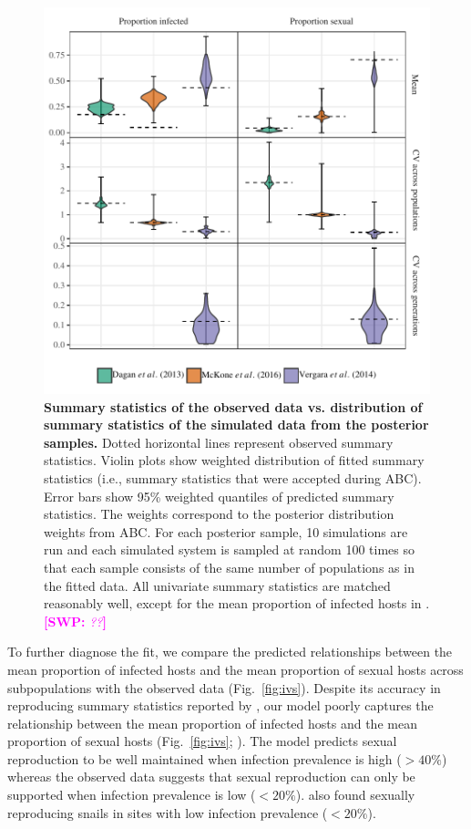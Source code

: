 \documentclass{article}\usepackage[]{graphicx}\usepackage[]{color}
\newcommand{\comment}[3]{\textcolor{#1}{\textbf{[#2: }\textit{#3}\textbf{]}}}
\newcommand{\swp}[1]{\comment{magenta}{SWP}{#1}}
\newcommand{\fref}[1]{Fig.~\ref{fig:#1}}
\begin{document}
\begin{figure}[!ht]
\includegraphics[width=\textwidth]{../fig/smc_summary.pdf}
\caption{{\bf Summary statistics of the observed data vs. distribution of summary statistics of the simulated data from the posterior samples.}
Dotted horizontal lines represent observed summary statistics.
Violin plots show weighted distribution of fitted summary statistics (i.e., summary statistics that were accepted during ABC). 
Error bars show 95\% weighted quantiles of predicted summary statistics.
The weights correspond to the posterior distribution weights from ABC.
For each posterior sample, 10 simulations are run and each simulated system is sampled at random 100 times so that each sample consists of the same number of populations as in the fitted data.
All univariate summary statistics are matched reasonably well, except for the mean proportion of infected hosts in \cite{mckone2016fine}. \swp{??}
}
\label{fig:smcsumm}
\end{figure}

To further diagnose the fit, we compare the predicted relationships between the mean proportion of infected hosts and the mean proportion of sexual hosts across subpopulations with the observed data (\fref{ivs}).
Despite its accuracy in reproducing summary statistics reported by \cite{dagan2013clonal}, 
our model poorly captures the relationship between the mean proportion of infected hosts and the mean proportion of sexual hosts (\fref{ivs}; \cite{dagan2013clonal}).
The model predicts sexual reproduction to be well maintained when infection prevalence is high ($> 40\%$) whereas
the observed data \citep{dagan2013clonal} suggests that sexual reproduction can only be supported when infection prevalence is low ($< 20\%$).
\cite{mckone2016fine} also found sexually reproducing snails in sites with low infection prevalence ($< 20\%$).
\end{document}
